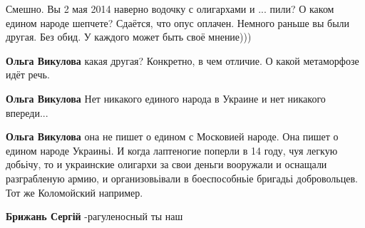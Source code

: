 \begin{itemize}
 
Смешно.
Вы 2 мая 2014 наверно водочку с олигархами и ... пили?
О каком едином народе шепчете?
Сдаётся, что опус оплачен. Немного раньше вы были другая.
Без обид. У каждого может быть своё мнение)))

\begin{itemize}

 
\textbf{Ольга Викулова} какая другая? Конкретно, в чем отличие. О какой метаморфозе идёт речь.

 
\textbf{Ольга Викулова} Нет никакого единого народа в Украине и нет никакого впереди...

 
\textbf{Ольга Викулова} она не пишет о едином с Московией народе. Она пишет о
едином народе Украиньі. И когда лаптеногие поперли в 14 году, чуя легкую
добьічу, то и украинские олигархи за свои деньги вооружали и оснащали
разграбленую армию, и организовьівали в боеспособньіе бригадьі добровольцев.
Тот же Коломойский например.

 
\textbf{Брижань Сергій} -рагуленосный ты наш\Laughey[1.0][white]

 

\end{itemize}
\end{itemize}
